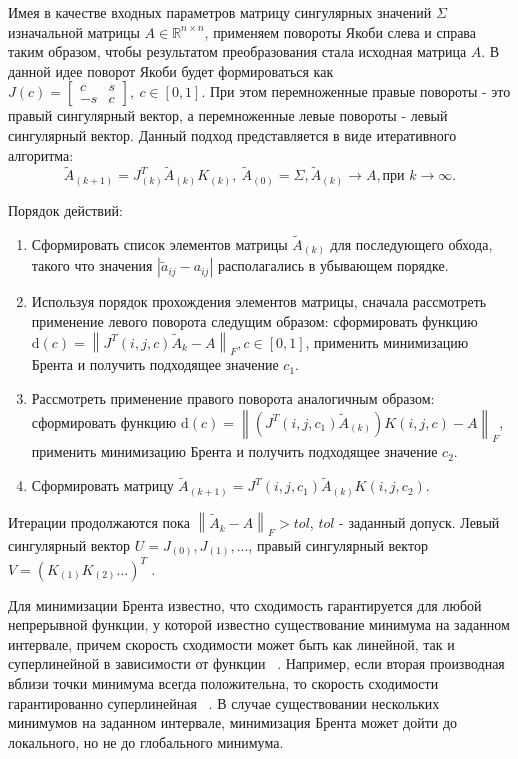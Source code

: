 Имея в качестве входных параметров матрицу сингулярных значений $\Sigma$ изначальной матрицы $A\in \mathbb{R}^{n\times n}$, применяем повороты Якоби слева и справа таким образом, чтобы результатом преобразования стала исходная матрица $A$. В данной идее поворот Якоби будет формироваться как $J(c) = \begin{bmatrix}
    c&s\\-s&c
\end{bmatrix},\ c\in[0,1]$. При этом перемноженные правые повороты - это правый сингулярный вектор, а перемноженные левые повороты - левый сингулярный вектор. Данный подход представляется в виде итеративного алгоритма:
\begin{equation}
    \tilde{A}_{(k+1)}=J^T_{(k)}\tilde{A}_{(k)}K_{(k)},\ \tilde{A}_{(0)} = \Sigma, \tilde{A}_{(k)} \longrightarrow A, \text{при }k \to \infty.
\end{equation}

Порядок действий:
\begin{enumerate}
    \item Сформировать список элементов матрицы $\tilde{A}_{(k)}$ для последующего обхода, такого что значения $|\tilde{a}_{ij} - a_{ij}|$ располагались в убывающем порядке.
    \item Используя порядок прохождения элементов матрицы, сначала рассмотреть применение левого поворота следущим образом: сформировать функцию \newline$\mathrm{d}(c)= \left\|J^T(i,j,c)\tilde{A}_{k} - A\right\|_F, c \in [0, 1]$, применить минимизацию Брента и получить подходящее значение $c_1$.
    \item Рассмотреть применение правого поворота аналогичным образом: сформировать функцию $\mathrm{d}(c) = \left\| (J^T(i,j,c_1)\tilde{A}_{(k)})K(i,j, c) - A \right\|_F$, применить минимизацию Брента и получить подходящее значение $c_2$.
    \item Сформировать матрицу $\tilde{A}_{(k+1)} =J^T(i,j,c_1)\tilde{A}_{(k)}K(i,j,c_2).$ 
    
\end{enumerate}

Итерации продолжаются пока $\left\| \tilde{A}_{k} - A\right\|_F >tol$, $tol$ - заданный допуск. Левый сингулярный вектор $U = J_{(0)}, J_{(1)}, ...$, правый сингулярный вектор $V = (K_{(1)}K_{(2)}...)^T$ .

Для минимизации Брента известно, что сходимость  гарантируется для любой непрерывной функции, у которой известно существование минимума на заданном интервале, причем скорость сходимости может быть как линейной, так и суперлинейной в зависимости от функции ~\cite{Brent_2013}. Например, если вторая производная вблизи точки минимума всегда положительна, то скорость сходимости гарантированно суперлинейная ~\cite{Brent1971}. В случае существовании нескольких минимумов на заданном интервале, минимизация Брента может дойти до локального, но не до глобального минимума. 

